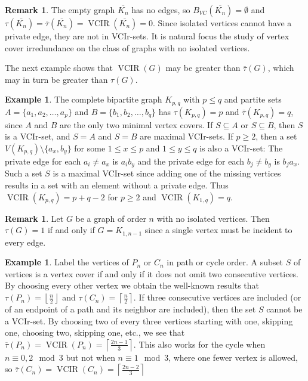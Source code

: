 \documentclass{article}
\numberwithin{figure}{section}
\numberwithin{table}{section}
\numberwithin{equation}{section}
\theoremstyle{definition}
\newtheorem{rem}[thm]{Remark}
\theoremstyle{definition}
\theoremstyle{definition}
\newtheorem{ex}[thm]{Example}
\newcommand{\ol}{\overline}
\newcommand{\lc}{\left\lceil}
\newcommand{\rc}{\right\rceil}
\newcommand{\lf}{\left\lfloor}
\newcommand{\rf}{\right\rfloor}
\newcommand{\vc}{\tau}
\newcommand{\vcbar}{\ol\vc}
\DeclareMathOperator{\VCIR}{VCIR}
\begin{document}
\begin{rem}\label{r:VCIrNoIsolates} 
   The empty graph $\ol{K_n}$ has no edges, so $B_{VC}(\ol{K_n})=\emptyset$ and $\tau(\ol{K_n})=\vcbar(\ol{K_n})=\VCIR(\ol{K_n})=0$. Since isolated vertices cannot have a private edge,  they are not in VCIr-sets. It is natural focus the  study of vertex cover irredundance on the class of graphs with no isolated vertices. 
\end{rem}



The next example shows that  $\VCIR(G)$ may be greater than $\vcbar(G)$, which may in turn be greater than $\tau(G)$.

\begin{ex}\label{e:VCIRbigger}
    The complete bipartite graph $K_{p,q}$ with $p \leq q$ and partite sets $A=\{a_1,a_2,\dots,a_p\}$ and $B=\{b_1,b_2,\dots,b_q\}$ has $\vc(K_{p,q})=p$ and $\vcbar(K_{p,q})=q$,  since $A$ and $B$ are the only two minimal vertex covers.  If 
     $S\subseteq A$ or $S\subseteq B$, then  $S$ is a VCIr-set, and $S=A$ and $S=B$ are maximal VCIr-sets.  If $p\ge 2$, then a set $V(K_{p,q})\setminus\{a_x,b_y\}$ for some $1 \leq x \leq p$ and $1 \leq y \leq q$ is also  a VCIr-set: The private edge for each $a_i \neq a_x$ is $a_ib_y$ and the private edge for each $b_j \neq b_y$ is $b_ja_x$. Such a set $S$ is a maximal VCIr-set since adding one of the missing vertices results in a set with an element without a private edge.   Thus  $\VCIR(K_{p,q})=p+q-2$ for $p\ge 2$ and $\VCIR(K_{1,q})=q$.
\end{ex}
 

 \begin{rem}\label{p:vcir-one}    Let $G$ be a graph of order $n$ with no isolated vertices. Then $\vc(G)=1$ if and only if $G=K_{1,n-1}$ since a single vertex must be incident to every edge. \end{rem}






\begin{ex}\label{ex:VC-path-cyc}
 Label the vertices of $P_n$ or $C_n$ in  path or cycle order.  A subset $S$ of vertices  is a vertex cover   if and only if it does not omit two  consecutive vertices.  By choosing every other vertex we obtain the   well-known results that $\vc(P_n)=\lf\frac{n}{2}\rf$ and $\vc(C_n)=\lc\frac{n}{2}\rc$.  If three consecutive vertices are included (or of an endpoint of a path and its neighbor are included), then the set $S$ cannot be a VCIr-set.  By choosing two of every three vertices starting with one, skipping one, choosing two, skipping one, etc., we 
 see that $\vcbar(P_n)=\VCIR(P_n)=\lc\frac{2n-1}3\rc$.  This also works for the cycle when $n\equiv 0, 2\mod 3$ but not when $n\equiv 1\mod 3$, where one fewer vertex is allowed, so $\vcbar(C_n)=\VCIR(C_n)=\lc\frac{2n-2}3\rc$
\end{ex}
\end{document}
